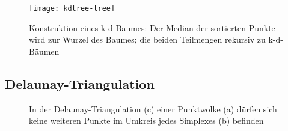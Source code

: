 \begin{figure}
  \texttt{[image: kdtree-tree]}
  \caption[Konstruktion eines k-d-Baumes]{
    Konstruktion eines k-d-Baumes:
    Der Median der sortierten Punkte wird zur Wurzel des Baumes; die beiden Teilmengen rekursiv zu k-d-Bäumen
  }
  \label{fig:kdtree}
\end{figure}


\subsection{Delaunay-Triangulation}
\label{datadelaunay}

\begin{figure}
  \centering
  \def\svgwidth{\textwidth}
  
  \caption[Beispiel des Delaunay-Kriteriums]{
    In der Delaunay-Triangulation (c) einer Punktwolke (a) dürfen sich keine weiteren Punkte im Umkreis jedes Simplexes (b) befinden
  }
  \label{fig:delaunay}
\end{figure}

